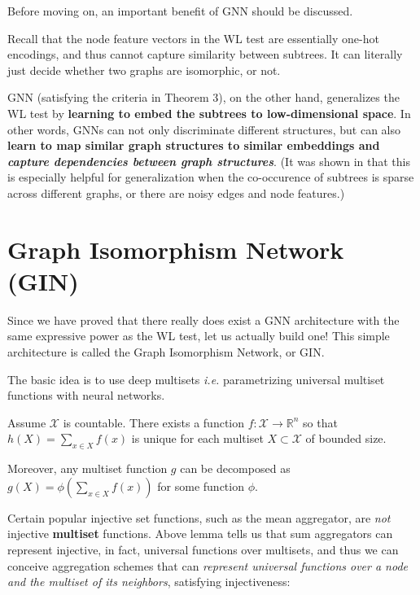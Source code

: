 Before moving on, an important benefit of GNN should be discussed.

Recall that the node feature vectors in the WL test are essentially one-hot encodings, and thus cannot capture similarity between subtrees. It can literally just decide whether two graphs are isomorphic, or not.

GNN (satisfying the criteria in Theorem 3), on the other hand, generalizes the WL test by {\bf learning to embed the subtrees to low-dimensional space}.
In other words, GNNs can not only discriminate different structures, but can also {\bf learn to map similar graph structures to similar embeddings and {\it capture dependencies between graph structures}}.
(It was shown in \cite{Yanardag2015} that this is especially helpful for generalization when the co-occurence of subtrees is sparse across different graphs, or there are noisy edges and node features.)


\section{Graph Isomorphism Network (GIN)}

Since we have proved that there really does exist a GNN architecture with the same expressive power as the WL test, let us actually build one!
This simple architecture is called the Graph Isomorphism Network, or GIN.

The basic idea is to use deep multisets\cite{Zaheer2017} {\it i.e.} parametrizing universal multiset functions with neural networks.


\begin{lemma}
Assume $\mathcal{X}$ is countable.
There exists a function $f : \mathcal{X} \rightarrow \mathbb{R}^n$ so that $h(X) = \sum_{x \in X} f(x)$ is unique for each multiset $X \subset \mathcal{X}$ of bounded size.

\noindent Moreover, any multiset function $g$ can be decomposed as $g(X) = \phi \left( \sum_{x \in X} f(x) \right)$ for some function $\phi$.
\end{lemma}

Certain popular injective set functions, such as the mean aggregator, are {\it not} injective {\bf multiset} functions.
Above lemma tells us that sum aggregators can represent injective, in fact, universal functions over multisets, and thus we can conceive aggregation schemes that can {\it represent universal functions over a node and the multiset of its neighbors}, satisfying injectiveness:



